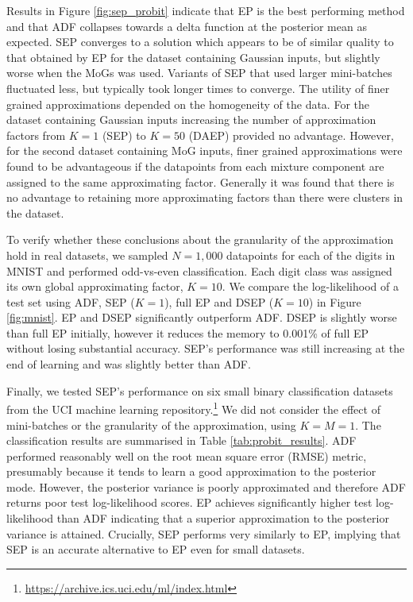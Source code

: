 Results in Figure \ref{fig:sep_probit} indicate that EP is the best performing method and that ADF collapses towards a delta function at the posterior mean as expected. SEP converges to a solution which appears to be of similar quality to that obtained by EP for the dataset containing Gaussian inputs, but slightly worse when the MoGs was used. Variants of SEP that used larger mini-batches fluctuated less, but typically took longer times to converge. The utility of finer grained approximations depended on the homogeneity of the data. For the dataset containing Gaussian inputs increasing the number of approximation factors from $K=1$ (SEP) to $K=50$ (DAEP) provided no advantage. However, for the second dataset containing MoG inputs, finer grained approximations were found to be advantageous if the datapoints from each mixture component are assigned to the same approximating factor. Generally it was found that there is no advantage to retaining more approximating factors than there were clusters in the dataset.  


To verify whether these conclusions about the granularity of the approximation hold in real datasets, we sampled $N=1,000$ datapoints for each of the digits in MNIST and performed odd-vs-even classification. Each digit class was assigned its own global approximating factor, $K=10$. We compare the log-likelihood of a test set using ADF, SEP ($K=1$), full EP and DSEP ($K=10$) in Figure \ref{fig:mnist}. EP and DSEP significantly outperform ADF. DSEP is slightly worse than full EP initially, however it reduces the memory to 0.001\% of full EP without losing substantial accuracy. SEP's performance was still increasing at the end of learning and was slightly better than ADF.

Finally, we tested SEP's performance on six small binary classification datasets from the UCI machine learning repository.\footnote{\url{https://archive.ics.uci.edu/ml/index.html}} We did not consider the effect of mini-batches or the granularity of the approximation, using $K=M=1$. The classification results are summarised in Table \ref{tab:probit_results}. ADF performed reasonably well on the root mean square error (RMSE) metric, presumably because it tends to learn a good approximation to the posterior mode. However, the posterior variance is poorly approximated and therefore ADF returns poor test log-likelihood scores. EP achieves significantly higher test log-likelihood than ADF indicating that a superior approximation to the posterior variance is attained. Crucially, SEP performs very similarly to EP, implying that SEP is an accurate alternative to EP even for small datasets.

